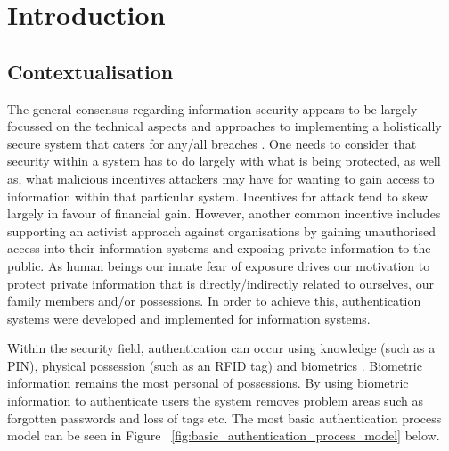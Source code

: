 
\chapter{Introduction}  %

\ifpdf
    \graphicspath{{Chapter1/Figs/Raster/}{Chapter1/Figs/PDF/}{Chapter1/Figs/}}
\else
    \graphicspath{{Chapter1/Figs/Vector/}{Chapter1/Figs/}}
\fi


\section{Contextualisation} %

The general consensus regarding information security appears to be largely focussed on the technical aspects and approaches to implementing a holistically secure system that caters for any/all breaches \cite{Anderson2001}. One needs to consider that security within a system has to do largely with what is being protected, as well as, what malicious incentives attackers may have for wanting to gain access to information within that particular system. Incentives for attack tend to skew largely in favour of financial gain. However, another common incentive includes supporting an activist approach against organisations by gaining unauthorised access into their information systems and exposing private information to the public. As human beings our innate fear of exposure drives our motivation to protect private information that is directly/indirectly related to ourselves, our family members and/or possessions. In order to achieve this, authentication systems were developed and implemented for information systems. 

Within the security field, authentication can occur using knowledge (such as a PIN), physical possession (such as an RFID tag) and biometrics \cite{Liu2001}. Biometric information remains the most personal of possessions. By using biometric information to authenticate users the system removes problem areas such as forgotten passwords and loss of tags etc. The most basic authentication process model can be seen in Figure ~\ref{fig:basic_authentication_process_model} below.



